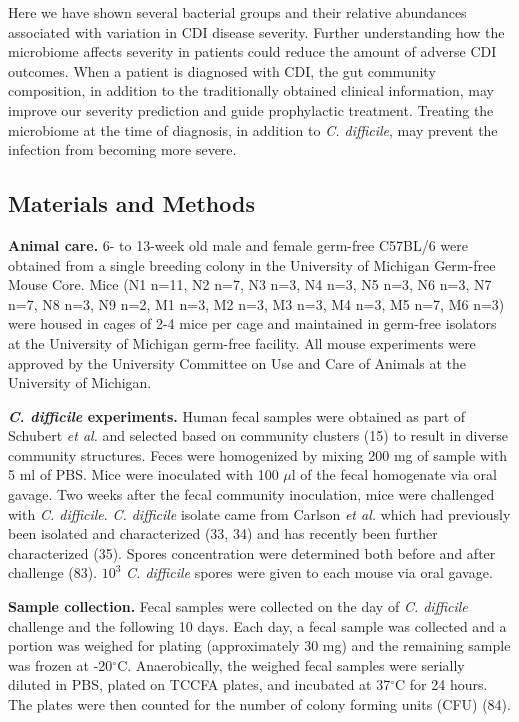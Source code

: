 \documentclass[
  12pt,
]{article}
\begin{document}
Here we have shown several bacterial groups and their relative
abundances associated with variation in CDI disease severity. Further
understanding how the microbiome affects severity in patients could
reduce the amount of adverse CDI outcomes. When a patient is diagnosed
with CDI, the gut community composition, in addition to the
traditionally obtained clinical information, may improve our severity
prediction and guide prophylactic treatment. Treating the microbiome at
the time of diagnosis, in addition to \emph{C. difficile}, may prevent
the infection from becoming more severe.

\hypertarget{materials-and-methods}{%
\subsection{Materials and Methods}\label{materials-and-methods}}

\textbf{Animal care.} 6- to 13-week old male and female germ-free
C57BL/6 were obtained from a single breeding colony in the University of
Michigan Germ-free Mouse Core. Mice (N1 n=11, N2 n=7, N3 n=3, N4 n=3, N5
n=3, N6 n=3, N7 n=7, N8 n=3, N9 n=2, M1 n=3, M2 n=3, M3 n=3, M4 n=3, M5
n=7, M6 n=3) were housed in cages of 2-4 mice per cage and maintained in
germ-free isolators at the University of Michigan germ-free facility.
All mouse experiments were approved by the University Committee on Use
and Care of Animals at the University of Michigan.

\textbf{\emph{C. difficile} experiments.} Human fecal samples were
obtained as part of Schubert \emph{et al.} and selected based on
community clusters (15) to result in diverse community structures. Feces
were homogenized by mixing 200 mg of sample with 5 ml of PBS. Mice were
inoculated with 100 \(\mu\)l of the fecal homogenate via oral gavage.
Two weeks after the fecal community inoculation, mice were challenged
with \emph{C. difficile}. \emph{C. difficile} isolate came from Carlson
\emph{et al.} which had previously been isolated and characterized (33,
34) and has recently been further characterized (35). Spores
concentration were determined both before and after challenge (83).
\(10^{3}\) \emph{C. difficile} spores were given to each mouse via oral
gavage.

\textbf{Sample collection.} Fecal samples were collected on the day of
\emph{C. difficile} challenge and the following 10 days. Each day, a
fecal sample was collected and a portion was weighed for plating
(approximately 30 mg) and the remaining sample was frozen at
-20\(^\circ\)C. Anaerobically, the weighed fecal samples were serially
diluted in PBS, plated on TCCFA plates, and incubated at 37\(^\circ\)C
for 24 hours. The plates were then counted for the number of colony
forming units (CFU) (84).
\end{document}
